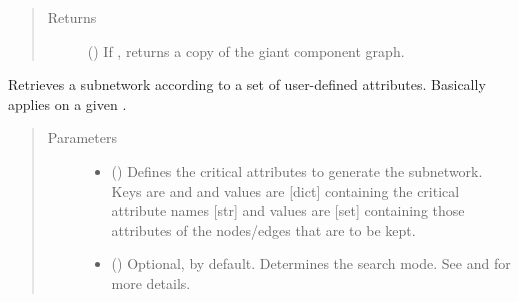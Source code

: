\documentclass[letterpaper,10pt,english]{sphinxmanual}
\begin{document}
\begin{fulllineitems}
\begin{fulllineitems}
\begin{quote}
\begin{description}
\item[{Returns}] \leavevmode
() \textendash{} If , returns a copy of
the giant component graph.

\end{description}\end{quote}

\end{fulllineitems}


\begin{fulllineitems}
\label{\detokenize{main:pypath.main.PyPath.get_max}}
\end{fulllineitems}


\begin{fulllineitems}
\label{\detokenize{main:pypath.main.PyPath.get_network}}
Retrieves a subnetwork according to a set of user-defined
attributes. Basically applies
{\hyperref[\detokenize{main:pypath.main.PyPath.get_sub}]{}} on a given .
\begin{quote}\begin{description}
\item[{Parameters}] \leavevmode\begin{itemize}
\item {} 
 () \textendash{} Defines the critical attributes to generate the subnetwork.
Keys are  and  and values are {[}dict{]}
containing the critical attribute names {[}str{]} and values
are {[}set{]} containing those attributes of the nodes/edges
that are to be kept.

\item {} 
 () \textendash{} Optional,  by default. Determines the search mode.
See {\hyperref[\detokenize{main:pypath.main.PyPath.search_attr_or}]{}} and
{\hyperref[\detokenize{main:pypath.main.PyPath.search_attr_and}]{}} for more
details.


\end{itemize}
\end{description}
\end{quote}
\end{fulllineitems}
\end{fulllineitems}
\end{document}
